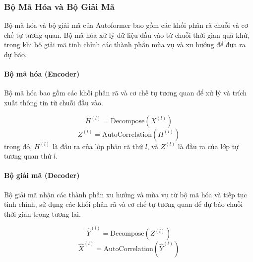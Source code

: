 \subsubsection{Bộ Mã Hóa và Bộ Giải Mã}

Bộ mã hóa và bộ giải mã của Autoformer bao gồm các khối phân rã chuỗi và cơ chế tự tương quan. Bộ mã hóa xử lý dữ liệu đầu vào từ chuỗi thời gian quá khứ, trong khi bộ giải mã tinh chỉnh các thành phần mùa vụ và xu hướng để đưa ra dự báo.

\paragraph{Bộ mã hóa (Encoder)}

Bộ mã hóa bao gồm các khối phân rã và cơ chế tự tương quan để xử lý và trích xuất thông tin từ chuỗi đầu vào.

\[
H^{(l)} = \text{Decompose}(X^{(l)})
\]
\[
Z^{(l)} = \text{AutoCorrelation}(H^{(l)})
\]
trong đó, $H^{(l)}$ là đầu ra của lớp phân rã thứ $l$, và $Z^{(l)}$ là đầu ra của lớp tự tương quan thứ $l$.

\paragraph{Bộ giải mã (Decoder)}

Bộ giải mã nhận các thành phần xu hướng và mùa vụ từ bộ mã hóa và tiếp tục tinh chỉnh, sử dụng các khối phân rã và cơ chế tự tương quan để dự báo chuỗi thời gian trong tương lai.

\[
\hat{Y}^{(l)} = \text{Decompose}(Z^{(l)})
\]
\[
\hat{X}^{(l)} = \text{AutoCorrelation}(\hat{Y}^{(l)})
\]